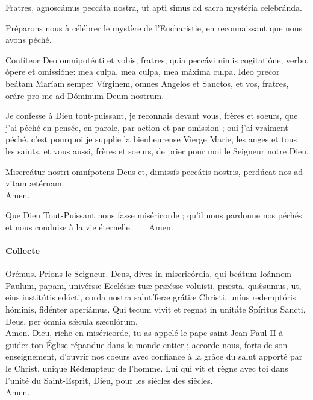 \documentclass[twoside]{article}
\begin{document}
\begin{paracol}{2}
\vv Fratres, agnoscámus peccáta nostra, 
ut apti simus ad sacra mystéria celebránda.

\switchcolumn

\vv Préparons nous à célébrer le mystère de l’Eucharistie, 
en reconnaissant que nous avons péché.\newpage

\switchcolumn*

\rr Confíteor Deo omnipoténti et vobis, fratres,
quia peccávi nimis
cogitatióne, verbo, ópere et omissióne: 
mea culpa, mea culpa, mea máxima culpa. 
Ideo precor beátam Maríam semper Vírginem,
omnes Angelos et Sanctos,
et vos, fratres, oráre pro me
ad Dóminum Deum nostrum. 

\switchcolumn

\rr Je confesse à Dieu tout-puissant, 
je reconnais devant vous, frères et soeurs, que j’ai péché
en pensée, en parole, par action et par omission ; 
oui j’ai vraiment péché.
c’est pourquoi je supplie
la bienheureuse Vierge Marie,
les anges et tous les saints,
et vous aussi, frères et soeurs, 
de prier pour moi le Seigneur notre Dieu. 

\switchcolumn*

\vv Misereátur nostri omnípotens Deus
et, dimissís peccátis nostris,
perdúcat nos ad vitam ætérnam. \\
\rr Amen. 

\switchcolumn

\vv Que Dieu Tout-Puissant nous fasse miséricorde ; qu'il nous pardonne nos péchés et nous conduise à la vie éternelle.~~~~\rr Amen.


\end{paracol}


\pagebreak

\paragraph{Collecte}

\begin{paracol}{2}
\vv Orémus.
\switchcolumn
\vv Prions le Seigneur.
\switchcolumn*
Deus, dives in misericórdia, qui beátum Ioánnem Paulum, papam, univérsæ Ecclésiæ tuæ præésse voluísti, præsta, quǽsumus, ut, eius institútis edócti, corda nostra salutíferæ grátiæ Christi, uníus redemptóris hóminis, fidénter aperiámus. Qui tecum vivit et regnat in unitáte Spíritus Sancti, Deus, per ómnia sǽcula sæculórum.\\
\rr Amen.
\switchcolumn
Dieu, riche en miséricorde, tu as appelé le pape saint Jean-Paul II à guider ton Église répandue dans le monde entier ; accorde-nous, forts de son enseignement, d’ouvrir nos coeurs avec confiance à la grâce du salut apporté par le Christ, unique Rédempteur de l’homme. Lui qui vit et règne avec toi dans l’unité du Saint-Esprit, Dieu, pour les siècles des siècles.\\
\rr Amen.
\end{paracol}
\end{document}
